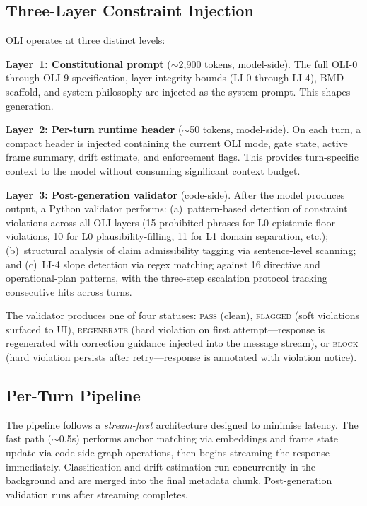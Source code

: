 \documentclass[11pt,a4paper]{article}
\begin{document}
\subsection{Three-Layer Constraint Injection}

OLI operates at three distinct levels:

\textbf{Layer~1: Constitutional prompt} ($\sim$2{,}900 tokens, model-side).
The full OLI-0 through OLI-9 specification, layer integrity bounds (LI-0 through LI-4), BMD scaffold, and system philosophy are injected as the system prompt.
This shapes generation.

\textbf{Layer~2: Per-turn runtime header} ($\sim$50 tokens, model-side).
On each turn, a compact header is injected containing the current OLI mode, gate state, active frame summary, drift estimate, and enforcement flags.
This provides turn-specific context to the model without consuming significant context budget.

\textbf{Layer~3: Post-generation validator} (code-side).
After the model produces output, a Python validator performs: (a)~pattern-based detection of constraint violations across all OLI layers (15 prohibited phrases for L0 epistemic floor violations, 10 for L0 plausibility-filling, 11 for L1 domain separation, etc.); (b)~structural analysis of claim admissibility tagging via sentence-level scanning; and (c)~LI-4 slope detection via regex matching against 16 directive and operational-plan patterns, with the three-step escalation protocol tracking consecutive hits across turns.

The validator produces one of four statuses: \textsc{pass} (clean), \textsc{flagged} (soft violations surfaced to UI), \textsc{regenerate} (hard violation on first attempt---response is regenerated with correction guidance injected into the message stream), or \textsc{block} (hard violation persists after retry---response is annotated with violation notice).

\subsection{Per-Turn Pipeline}

The pipeline follows a \emph{stream-first} architecture designed to minimise latency.
The fast path ($\sim$0.5s) performs anchor matching via embeddings and frame state update via code-side graph operations, then begins streaming the response immediately.
Classification and drift estimation run concurrently in the background and are merged into the final metadata chunk.
Post-generation validation runs after streaming completes.
\end{document}
